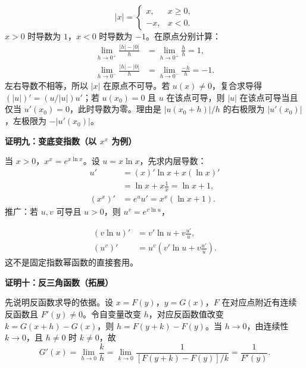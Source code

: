 \begin{proofbox}
\begin{minipage}{\linewidth}
\end{minipage}
\[
|x|=\begin{cases}x,&x\ge0,\\-x,&x<0.\end{cases}
\]
$x>0$ 时导数为 $1$，$x<0$ 时导数为 $-1$。在原点分别计算：
\[
\begin{aligned}
\lim_{h\to0^+}\frac{|h|-|0|}h&=\lim_{h\to0^+}\frac hh=1,\\
\lim_{h\to0^-}\frac{|h|-|0|}h&=\lim_{h\to0^-}\frac{-h}h=-1.
\end{aligned}
\]
左右导数不相等，所以 $|x|$ 在原点不可导。若 $u(x)\ne0$，复合求导得 $(|u|)'=(u/|u|)u'$；若 $u(x_0)=0$ 且 $u$ 在该点可导，则 $|u|$ 在该点可导当且仅当 $u'(x_0)=0$，此时导数为零。理由是 $|u(x_0+h)|/h$ 的右极限为 $|u'(x_0)|$，左极限为 $-|u'(x_0)|$。

\medskip
\begin{minipage}{\linewidth}
\textbf{\textcolor{CProof}{证明九：变底变指数（以 $x^x$ 为例）}}


\end{minipage}

当 $x>0$，$x^x=e^{x\ln x}$。设 $u=x\ln x$，先求内层导数：
\[
\begin{aligned}
u'&=(x)'\ln x+x(\ln x)'\\
&=\ln x+x\frac1x=\ln x+1,\\
(x^x)'&=e^u u'=x^x(\ln x+1).
\end{aligned}
\]
推广：若 $u,v$ 可导且 $u>0$，则 $u^v=e^{v\ln u}$，


\[
\begin{aligned}
(v\ln u)'&=v'\ln u+v\frac{u'}u,\\
(u^v)'&=u^v\left(v'\ln u+v\frac{u'}u\right).
\end{aligned}
\]
这不是固定指数幂函数的直接套用。

\medskip
\begin{minipage}{\linewidth}
\textbf{\textcolor{CProof}{证明十：反三角函数（拓展）}}


\end{minipage}

先说明反函数求导的依据。设 $x=F(y)$，$y=G(x)$，$F$ 在对应点附近有连续反函数且 $F'(y)\ne0$。令自变量改变 $h$，对应反函数值改变 $k=G(x+h)-G(x)$，则 $h=F(y+k)-F(y)$。当 $h\to0$，由连续性 $k\to0$，且 $h\ne0$ 时 $k\ne0$，故
\[
G'(x)=\lim_{h\to0}\frac{k}{h}
=\lim_{k\to0}\frac1{[F(y+k)-F(y)]/k}
=\frac1{F'(y)}.
\]



\end{proofbox}
